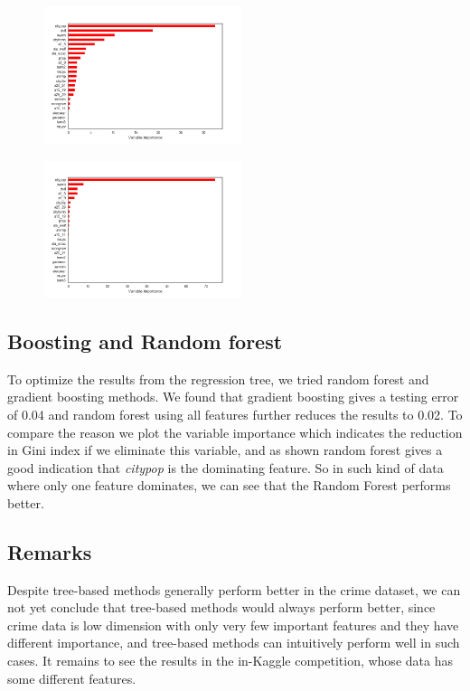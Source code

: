 \documentclass{article}
\begin{document}
\begin{figure}
\centering
\begin{minipage}{.5\textwidth}
  \centering
  \includegraphics[width=.48\linewidth,height=4cm]{crime_boosttu}
  \label{fig:test1}
\end{minipage}%
\begin{minipage}{.5\textwidth}
  \centering
  \includegraphics[width=.48\linewidth,height=4cm]{crime_randtu}
  \label{fig:test2}
\end{minipage}
\end{figure}


\subsection{Boosting and Random forest}
To optimize the results from the regression tree, we tried random forest and gradient boosting methods. We found that gradient boosting gives a testing error of 0.04 and random forest using all features further reduces the results to 0.02. To compare the reason we plot the variable importance which indicates the reduction in Gini index if we eliminate this variable, and as shown random forest gives a good indication that \textit{citypop} is the dominating feature. So in such kind of data where only one feature dominates, we can see that the Random Forest performs better.

\subsection{Remarks}
Despite tree-based methods generally perform better in the crime dataset, we can not yet conclude that tree-based methods would always perform better, since crime data is low dimension with only very few important features and they have different importance, and tree-based methods can intuitively perform well in such cases. It remains to see the results in the in-Kaggle competition, whose data has some different features.
\end{document}

